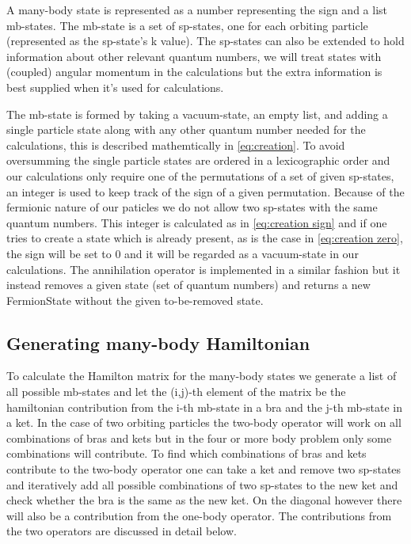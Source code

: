 A many-body state is represented as a number representing the sign and a list mb-states.
 The mb-state is a set of sp-states, one for each orbiting particle (represented as the sp-state's k value). 
 The sp-states can also be extended to hold information about other relevant quantum numbers, we will treat states with (coupled) angular momentum in the calculations but the extra information is best supplied when it's used for calculations.
 
 
 

 The mb-state is formed by taking a vacuum-state, an empty list, and adding a single particle state along with any other quantum number needed for the calculations, this is described mathemtically in \ref{eq:creation}.
 To avoid oversumming the single particle states are ordered in a lexicographic order and our calculations only require one of the permutations of a set of given sp-states, an integer is used to keep track of the sign of a given permutation. 
 Because of the fermionic nature of our paticles we do not allow two sp-states with the same quantum numbers.
 This integer is calculated as in \ref{eq:creation sign} and if one tries to create a state which is already present, as is the case in \ref{eq:creation zero}, the sign will be set to 0 and it will be regarded as a vacuum-state in our calculations.
 The annihilation operator is implemented in a similar fashion but it instead removes a given state (set of quantum numbers) and returns a new FermionState without the given to-be-removed state.
 
 
\subsection{Generating many-body Hamiltonian}
To calculate the Hamilton matrix for the many-body states we generate a list of all possible mb-states and let the (i,j)-th element of the matrix be the hamiltonian contribution from the i-th mb-state in a bra and the j-th mb-state in a ket. 
 In the case of two orbiting particles the two-body operator will work on all combinations of bras and kets but in the four or more body problem only some combinations will contribute.
 To find which combinations of bras and kets contribute to the two-body operator one can take a ket and remove two sp-states and iteratively add all possible combinations of two sp-states to the new ket and check whether the bra is the same as the new ket.
 On the diagonal however there will also be a contribution from the one-body operator.
 The contributions from the two operators are discussed in detail below.

